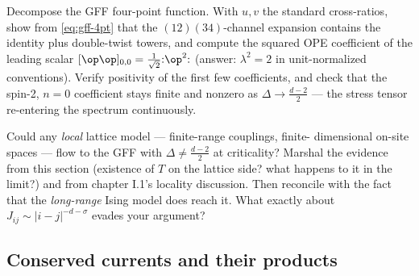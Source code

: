 \begin{exercise}[classic]
\label{exr:gff-ope}
Decompose the GFF four-point function. With $u, v$ the standard cross-ratios,
show from \eqref{eq:gff-4pt} that the $(12)(34)$-channel expansion contains
the identity plus double-twist towers, and compute the squared OPE coefficient
of the leading scalar $[\op\op]_{0,0} = \tfrac{1}{\sqrt 2}{:}\op^2{:}$
(answer: $\lambda^2 = 2$ in unit-normalized conventions). Verify positivity
of the first few coefficients, and check that the spin-2, $n=0$ coefficient
stays finite and nonzero as $\Delta \to \frac{d-2}{2}$ --- the stress tensor
re-entering the spectrum continuously.
\end{exercise}

\begin{exercise}[thinker]
\label{exr:gff-lattice}
Could any \emph{local} lattice model --- finite-range couplings, finite-
dimensional on-site spaces --- flow to the GFF with $\Delta \ne
\frac{d-2}{2}$ at criticality? Marshal the evidence from this section
(existence of $T$ on the lattice side? what happens to it in the limit?) and
from chapter I.1's locality discussion. Then reconcile with the fact that the
\emph{long-range} Ising model does reach it. What exactly about
$J_{ij} \sim |i-j|^{-d-\sigma}$ evades your argument?
\end{exercise}

\subsection{Conserved currents and their products}
\label{sec:currents}

